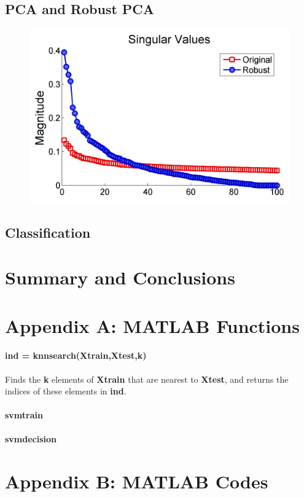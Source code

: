 \documentclass{article}
\begin{document}
\subsection{PCA and Robust PCA}
\begin{figure}[H]
\centering
\includegraphics[width=.6\textwidth]{singularvaluescompare}
\end{figure}

\subsection{Classification}

\section{Summary and Conclusions}

\newpage
\section*{Appendix A: MATLAB Functions}

\paragraph{ind = knnsearch(Xtrain,Xtest,k)} Finds the \textbf{k} elements of \textbf{Xtrain} that are nearest to \textbf{Xtest}, and returns the indices of these elements in \textbf{ind}.

\paragraph{svmtrain}

\paragraph{svmdecision}

\section*{Appendix B: MATLAB Codes}

\end{document}
